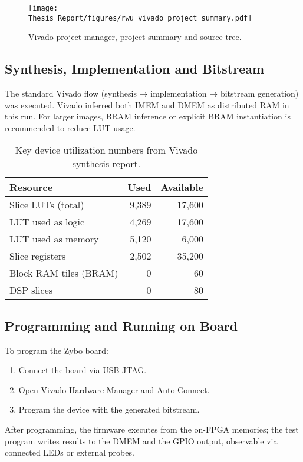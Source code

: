 \begin{figure}[ht]
  \centering
  \texttt{[image: Thesis\_Report/figures/rwu\_vivado\_project\_summary.pdf]}
  \caption{Vivado project manager, project summary and source tree.}
  \label{fig:rwu_vivado_project_summary}
\end{figure}

\subsection{Synthesis, Implementation and Bitstream}
The standard Vivado flow (synthesis → implementation → bitstream generation) was executed.  
Vivado inferred both IMEM and DMEM as distributed RAM in this run. For larger images, BRAM inference or explicit BRAM instantiation is recommended to reduce LUT usage.

\begin{table}[H]
  \centering
  \begin{tabular}{lrr}
    \toprule
    Resource & Used & Available \\
    \midrule
    Slice LUTs (total)      & 9,389  & 17,600 \\
    LUT used as logic       & 4,269  & 17,600 \\
    LUT used as memory      & 5,120  & 6,000  \\
    Slice registers         & 2,502  & 35,200 \\
    Block RAM tiles (BRAM)  & 0      & 60     \\
    DSP slices              & 0      & 80     \\
    \bottomrule
  \end{tabular}
  \caption{Key device utilization numbers from Vivado synthesis report.}
  \label{tab:vivado_util}
\end{table}

\subsection{Programming and Running on Board}
To program the Zybo board:
\begin{enumerate}
  \item Connect the board via USB-JTAG.
  \item Open Vivado Hardware Manager and Auto Connect.
  \item Program the device with the generated bitstream.
\end{enumerate}
After programming, the firmware executes from the on-FPGA memories; the test program writes results to the DMEM and the GPIO output, observable via connected LEDs or external probes.

